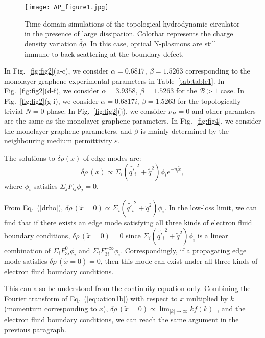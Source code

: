 \documentclass[%
reprint,
amsmath,amssymb,
aps,superscriptaddress
]{revtex4-2}
\begin{document}
\begin{figure}[t]
    \centering
    \texttt{[image: AP\_figure1.jpg]}
    \caption{Time-domain simulations of the topological hydrodynamic circulator in the presence of large dissipation. Colorbar represents the charge density variation $\widetilde{\delta \rho}$. In this case, optical N-plasmons are still immune to back-scattering at the boundary defect.}
    \label{fig:fig6}
\end{figure}

In Fig.~\ref{fig:fig2}(a-c), we consider $\alpha=0.6817, \ \beta = 1.5263$ corresponding to the monolayer graphene experimental parameters in Table~\ref{tab:table1}. In Fig.~\ref{fig:fig2}(d-f), we consider $\alpha=3.9358, \ \beta = 1.5263$ for the $\mathcal{B}>1$ case. In Fig.~\ref{fig:fig2}(g-i), we consider $\alpha=0.6817i, \ \beta = 1.5263$ for the topologically trivial $N=0$ phase. In Fig.~\ref{fig:fig2}(j), we consider $\nu_H=0$  and other paramters are the same as the monolayer graphene parameters. In Fig.~\ref{fig:fig4}, we consider the monolayer graphene parameters, and $\beta$ is mainly determined by the neighbouring medium permittivity $\varepsilon$.

The solutions to $\delta \rho (x)$ of edge modes are:
\begin{equation}\label{drho}
    \delta \rho \, (x) \propto \Sigma_i (\tilde{q'_i}^2+\tilde{q}^2) \phi_i e^{-\eta_i \tilde{x}},
\end{equation}
where $\phi_i$ satisfies $\Sigma_j F_{ij} \phi_j =0$. 

From Eq.~(\ref{drho}), $\delta \rho \, (\tilde{x}=0) \propto \Sigma_i (\tilde{q'_i}^2+\tilde{q}^2) \phi_i$. In the low-loss limit, we can find that if there exists an edge mode satisfying all three kinds of electron fluid boundary conditions, $\delta \rho \, (\tilde{x}=0)  = 0$ since $\Sigma_i (\tilde{q'_i}^2+\tilde{q}^2) \phi_i$ is a linear combination of $\Sigma_i F_{3i}^0 \phi_i$ and $\Sigma_i F_{3i}^{+\infty} \phi_i$. Correspondingly, if a propagating edge mode satisfies $\delta \rho \, (\tilde{x}=0)  = 0$, then this mode can exist under all three kinds of electron fluid boundary conditions.

This can also be understood from the continuity equation only. Combining the Fourier transform of Eq.~(\ref{equation1b}) with respect to $x$ multiplied by $k$ (momentum corresponding to $x$),  $\delta \rho \, (\tilde{x}=0) \propto \lim_{|k|\to\infty} k f(k)$~\cite{cohen2018hall}, and the electron fluid boundary conditions, we can reach the same argument in the previous paragraph.
\end{document}

